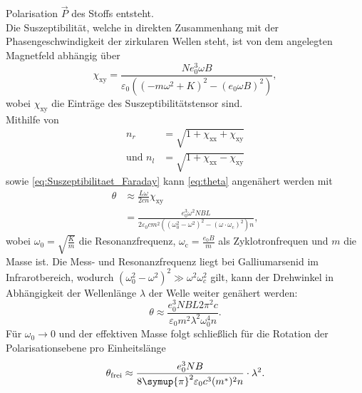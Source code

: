 Polarisation $\vec{P}$ des Stoffs entsteht.\\
Die Suszeptibilität, welche in direkten Zusammenhang mit der Phasengeschwindigkeit der zirkularen Wellen steht, ist von dem angelegten Magnetfeld abhängig über
\begin{equation}
    \chi_\text{xy} = \frac{Ne_0^3\omega B}{\varepsilon_0\left(\left(-m\omega^2+K\right)^2-\left(e_0\omega B\right)^2\right)},
    \label{eq:Suszeptibilitaet_Faraday}
\end{equation}
wobei $\chi_\text{xy}$ die Einträge des Suszeptibilitätstensor sind.\\
Mithilfe von 
\begin{align}
    n_r &= \sqrt{1+\chi_\text{xx}+\chi_\text{xy}} \\
     \text{und } n_l &= \sqrt{1+\chi_\text{xx}-\chi_\text{xy}}
\end{align}
sowie \autoref{eq:Suszeptibilitaet_Faraday} kann \autoref{eq:theta} angenähert werden mit 
\begin{align}
    \theta &\approx \frac{L\omega}{2cn}\chi_{\text{xy}} \label{eq:theta_rl_chi} \\
    &= \frac{e_0^3\omega^2 NBL} {2\varepsilon_0 cm^2\left(\left(\omega_0^2-\omega^2\right)^2-\left(\omega \cdot \omega_\text{c}\right)^2\right)n},
\end{align}
wobei $\omega_0 = \sqrt{\frac{K}{m}}$ die Resonanzfrequenz, $\omega_\text{c} = \frac{e_0B}{m}$ als Zyklotronfrequen und $m$ die Masse ist. Die Mess- und Resonanzfrequenz
liegt bei Galliumarsenid im Infrarotbereich, wodurch $\left(\omega_0^2 - \omega^2\right)^2 \gg \omega^2\omega_c^2$ gilt, kann der Drehwinkel in Abhängigkeit der Wellenlänge
$\lambda$ der Welle weiter genähert werden:
\begin{equation}
    \theta \approx \frac{e_0^3 NBL 2 \pi^2 c}{\varepsilon_0 m^2 \lambda^2 \omega_0^4 n}.
\end{equation}
Für $\omega_0 \rightarrow 0$ und der effektiven Masse folgt schließlich für die Rotation der Polarisationsebene pro Einheitslänge
\begin{equation}
    \theta_\text{frei} \approx \frac{e_0^3 N B}{8\symup{\pi}^2 \varepsilon_0 c^3 (m^*)^2 n} \cdot \lambda^2.
\end{equation}
